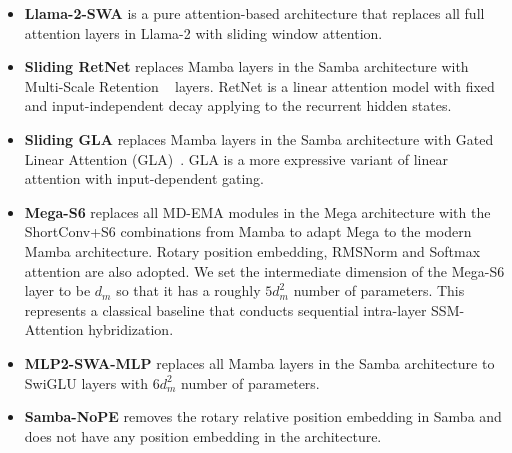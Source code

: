 \documentclass{article}
\begin{document}
\begin{itemize}

    \item \textbf{Llama-2-SWA} is a pure attention-based architecture that replaces all full attention layers in Llama-2 with sliding window attention. 
    \item \textbf{Sliding RetNet} replaces Mamba layers in the Samba architecture with Multi-Scale Retention ~\citep{sun2023retentive} layers. RetNet is a linear attention model with fixed and input-independent decay applying to the recurrent hidden states.
    \item \textbf{Sliding GLA} replaces Mamba layers in the Samba architecture with Gated Linear Attention (GLA)~\citep{yang2023gated}. GLA is a more expressive variant of linear attention with input-dependent gating.
    \item  \textbf{Mega-S6} replaces all MD-EMA modules in the Mega \citep{mega} architecture 
 with the ShortConv+S6 combinations from Mamba to adapt Mega to the modern Mamba architecture. Rotary position embedding, RMSNorm and Softmax attention are also adopted. We set the intermediate dimension of the Mega-S6 layer to be $d_m$ so that it has a roughly $5d_m^2$ number of parameters. This represents a classical baseline that conducts sequential intra-layer SSM-Attention hybridization.
     \item \textbf{MLP2-SWA-MLP} replaces all Mamba layers in the Samba architecture to SwiGLU layers with $6d_m^2$ number of parameters.
    
     \item \textbf{Samba-NoPE} removes the rotary relative position embedding in Samba and does not have any position embedding in the architecture.


\end{itemize}
\end{document}
